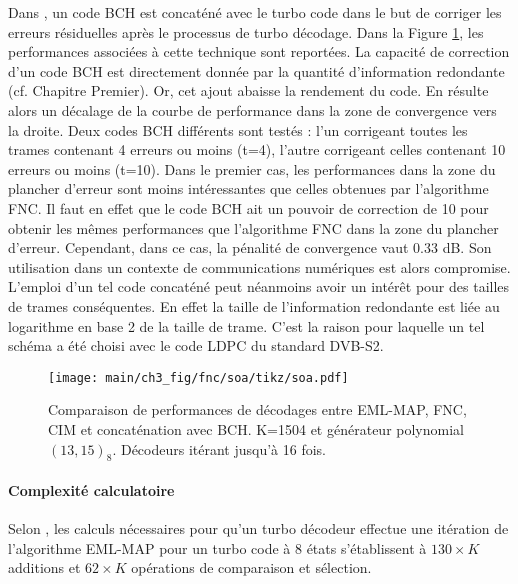 Dans \cite{andersenBCH}, un code BCH est concaténé avec le turbo code dans le but de corriger les erreurs résiduelles 
après le processus de turbo décodage. Dans la Figure \ref{fig:fnc_soa}, les performances associées à cette technique sont
reportées. La capacité de 
correction d'un code BCH est directement donnée par la quantité d'information redondante (cf. Chapitre Premier). Or, cet 
ajout abaisse la rendement du code. En résulte alors un décalage de la courbe de performance dans la zone de convergence 
vers la droite. Deux codes BCH différents sont testés : l'un corrigeant toutes les trames contenant 4 erreurs ou moins (t=4), l'autre 
corrigeant celles contenant 10 erreurs ou moins (t=10). Dans le premier cas, les performances dans la zone du plancher 
d'erreur sont moins intéressantes que celles obtenues par l'algorithme FNC. Il faut en effet que le code BCH ait un pouvoir
de correction de 10 pour obtenir les mêmes performances que l'algorithme FNC dans la zone du plancher d'erreur. Cependant, 
dans ce cas, la pénalité de convergence vaut 0.33 dB. Son utilisation dans un contexte de communications numériques 
est alors compromise. L'emploi d'un tel code concaténé peut néanmoins avoir un intérêt pour des tailles de trames
conséquentes. En effet la taille de l'information redondante est liée au logarithme en base 2 de la taille de trame.
C'est la raison pour laquelle un tel schéma a été choisi avec le code LDPC du standard DVB-S2.

\begin{figure}[!htb]
	\centering
	\texttt{[image: main/ch3\_fig/fnc/soa/tikz/soa.pdf]}
	\caption{Comparaison de performances de décodages entre EML-MAP, FNC, CIM et concaténation avec BCH. K=1504 et générateur
	polynomial $(13,15)_8$.	Décodeurs itérant jusqu'à 16 fois. \label{fig:fnc_soa}}
\end{figure}

\paragraph*{Complexité calculatoire} Selon \cite{david_gnaedig_thesis}, les calculs nécessaires pour qu'un turbo décodeur 
effectue une itération de l'algorithme EML-MAP pour un turbo code à 8 états s'établissent à $130\times K$ additions 
et $62\times K$ opérations de comparaison et sélection.

